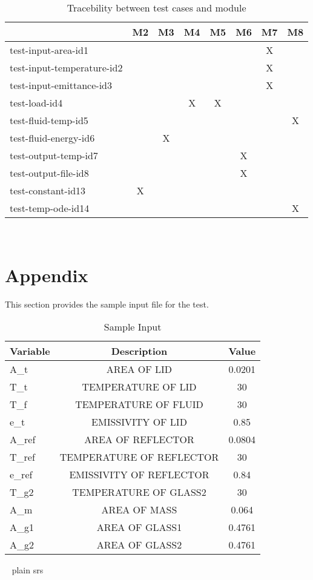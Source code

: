 \documentclass[12pt, titlepage]{article}
\begin{document}
\begin{table}[h!]
\begin{center}
\begin{tabular}{ l|c|c|c|c|c|c|c }
\hline
 & M2   & M3 & M4 & M5 & M6 & M7 & M8 \\
\hline
test-input-area-id1 & & & & & & X & \\
\hline
test-input-temperature-id2 & & & & & & X &\\
\hline
test-input-emittance-id3 & & & & & & X &\\
\hline
test-load-id4 & & & X & X & & &\\
\hline
test-fluid-temp-id5 & & & & & & & X \\
\hline
test-fluid-energy-id6 & & X & & & & & \\
\hline
test-output-temp-id7 & & & & & X & & \\
\hline
test-output-file-id8 & & & & & X & & \\
\hline
test-constant-id13 & X & & & & & & \\
\hline
test-temp-ode-id14 & & & & & & & X \\

\hline
\end{tabular}
\caption{Tracebility between test cases and module}
\label{tab:tc-traceability-module}
\end{center}
\end{table}
\pagebreak

~\newline
\newpage
\section{Appendix}
This section provides the sample input file for the test. 

\begin{table}[h!]
\begin{center}
\begin{tabular}{ l|c|c}

\hline 
Variable & Description & Value \\
\hline
A\_t &  AREA OF LID & 0.0201 \\
\hline

T\_t &  TEMPERATURE OF LID & 30 \\
\hline
T\_f & TEMPERATURE OF FLUID & 30 \\
\hline
e\_t & EMISSIVITY OF LID & 0.85 \\
\hline
A\_ref & AREA OF REFLECTOR & 0.0804 \\
\hline
T\_ref & TEMPERATURE OF REFLECTOR & 30 \\
\hline
e\_ref & EMISSIVITY OF REFLECTOR & 0.84\\
\hline
T\_g2 &  TEMPERATURE OF GLASS2 & 30 \\
\hline
A\_m & AREA OF MASS & 0.064 \\ 
\hline
A\_g1 & AREA OF GLASS1 & 0.4761 \\ 
\hline
A\_g2 & AREA OF GLASS2 & 0.4761 \\ 
\hline
\end{tabular}
\caption{Sample Input}
\label{tab:sample-input}
\end{center}
\end{table}

~\newline
\newpage
 {plain}
 {srs}
\end{document}
